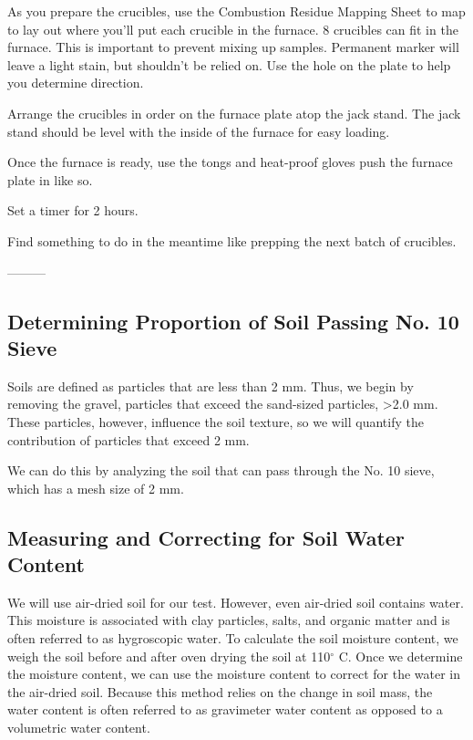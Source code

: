 \documentclass[12pt]{../SOP4_alpha}\usepackage[]{graphicx}\usepackage[]{xcolor}
\begin{document}
\NP As you prepare the crucibles, use the Combustion Residue Mapping Sheet to map to lay out where you'll put each crucible in the furnace. 8 crucibles can fit in the furnace.
\NP This is important to prevent mixing up samples. Permanent marker will leave a light stain, but shouldn't be relied on. Use the hole on the plate to help you determine direction.

 
\NP Arrange the crucibles in order on the furnace plate atop the jack stand. The jack stand should be level with the inside of the furnace for easy loading.

\NP Once the furnace is ready, use the tongs and heat-proof gloves push the furnace plate in like so.


\NP Set a timer for 2 hours.

\NP Find something to do in the meantime like prepping the next batch of crucibles.
  
  
  ---------
  
  

\subsection{Determining Proportion of Soil Passing No. 10 Sieve}

\NP Soils are defined as particles that are less than 2 mm. Thus, we begin by removing the gravel, particles that exceed the sand-sized particles, >2.0 mm. These particles, however, influence the soil texture, so we will quantify the contribution of particles that exceed 2 mm. 

\NP We can do this by analyzing the soil that can pass through the No. 10 sieve, which has a mesh size of 2 mm.  

  
\subsection{Measuring and Correcting for Soil Water Content}

\NP We will use air-dried soil for our test. However, even air-dried soil contains water. This moisture is associated with clay particles, salts, and organic matter and is often referred to as hygroscopic water. To calculate the soil moisture content, we weigh the soil before and after oven drying the soil at 110$^\circ$ C. Once we determine the moisture content, we can use the moisture content to correct for the water in the air-dried soil. Because this method relies on the change in soil mass, the water content is often referred to as gravimeter water content as opposed to a volumetric water content.
\end{document}
